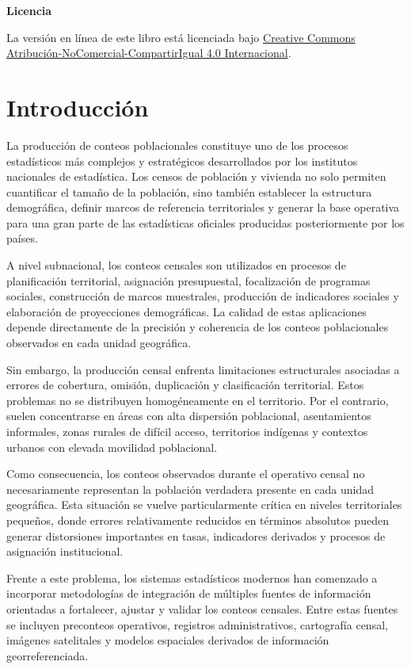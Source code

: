 \documentclass[
  spanish,
]{book}
\begin{document}
\textbf{Licencia}

La versión en línea de este libro está licenciada bajo
\href{http://creativecommons.org/licenses/by-nc-sa/4.0/}{Creative Commons Atribución-NoComercial-CompartirIgual 4.0 Internacional}.

\chapter*{Introducción}\label{introducciuxf3n}

La producción de conteos poblacionales constituye uno de los procesos estadísticos más complejos y estratégicos desarrollados por los institutos nacionales de estadística. Los censos de población y vivienda no solo permiten cuantificar el tamaño de la población, sino también establecer la estructura demográfica, definir marcos de referencia territoriales y generar la base operativa para una gran parte de las estadísticas oficiales producidas posteriormente por los países.

A nivel subnacional, los conteos censales son utilizados en procesos de planificación territorial, asignación presupuestal, focalización de programas sociales, construcción de marcos muestrales, producción de indicadores sociales y elaboración de proyecciones demográficas. La calidad de estas aplicaciones depende directamente de la precisión y coherencia de los conteos poblacionales observados en cada unidad geográfica.

Sin embargo, la producción censal enfrenta limitaciones estructurales asociadas a errores de cobertura, omisión, duplicación y clasificación territorial. Estos problemas no se distribuyen homogéneamente en el territorio. Por el contrario, suelen concentrarse en áreas con alta dispersión poblacional, asentamientos informales, zonas rurales de difícil acceso, territorios indígenas y contextos urbanos con elevada movilidad poblacional.

Como consecuencia, los conteos observados durante el operativo censal no necesariamente representan la población verdadera presente en cada unidad geográfica. Esta situación se vuelve particularmente crítica en niveles territoriales pequeños, donde errores relativamente reducidos en términos absolutos pueden generar distorsiones importantes en tasas, indicadores derivados y procesos de asignación institucional.

Frente a este problema, los sistemas estadísticos modernos han comenzado a incorporar metodologías de integración de múltiples fuentes de información orientadas a fortalecer, ajustar y validar los conteos censales. Entre estas fuentes se incluyen preconteos operativos, registros administrativos, cartografía censal, imágenes satelitales y modelos espaciales derivados de información georreferenciada.
\end{document}
